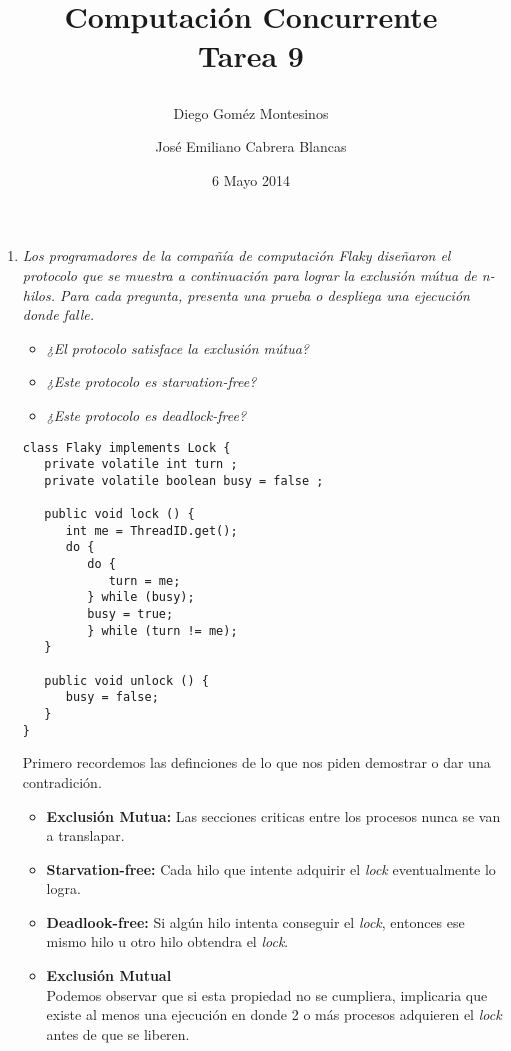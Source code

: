 \documentclass{article}
\title{ Computación Concurrente \\ \Large{Tarea 9}
\author{
  Diego Goméz Montesinos
  \and
  José Emiliano Cabrera Blancas
  }
\date{6 Mayo 2014}
}
\begin{document}
\maketitle
\begin{enumerate}
  
\item{
    \textsl{
      Los programadores de la compañía de computación Flaky diseñaron
      el protocolo que se muestra a continuación para lograr la
      exclusión mútua de n-hilos. Para cada pregunta, presenta una
      prueba o despliega una ejecución donde falle.
    }
      \begin{itemize}
        \item{\textsl{¿El protocolo satisface la exclusión mútua?}}
        \item{\textsl{¿Este protocolo es starvation-free?}}
        \item{\textsl{¿Este protocolo es deadlock-free?}}
      \end{itemize}

      \renewcommand{\lstlistingname}{}
\begin{lstlisting}[frame=single]
class Flaky implements Lock {
   private volatile int turn ;
   private volatile boolean busy = false ; 
   
   public void lock () {
      int me = ThreadID.get();
      do {
         do {
            turn = me;
         } while (busy);
         busy = true;
         } while (turn != me);
   }

   public void unlock () {
      busy = false;
   }
}
\end{lstlisting}
      
      Primero recordemos las definciones de lo que nos piden demostrar
      o dar una contradición.
      \begin{itemize}
      \item{\textbf{Exclusión Mutua:} Las secciones criticas entre
          los procesos nunca se van a translapar.}

        \item {\textbf{Starvation-free:} Cada hilo que intente
            adquirir el \textit{lock} eventualmente lo logra.}

        \item{\textbf{Deadlook-free:} Si algún hilo intenta conseguir
            el \textit{lock}, entonces ese mismo hilo u otro hilo
            obtendra el \textit{lock}.}
      \end{itemize}

      \begin{itemize}
        \item{\textbf{Exclusión Mutual}\\
            Podemos observar que si esta propiedad no se cumpliera,
            implicaria que existe al menos una ejecución en donde 2 o
            más procesos adquieren el \textit{lock} antes de que se
            liberen.\\

}
\end{itemize}}
\end{enumerate}
\end{document}
